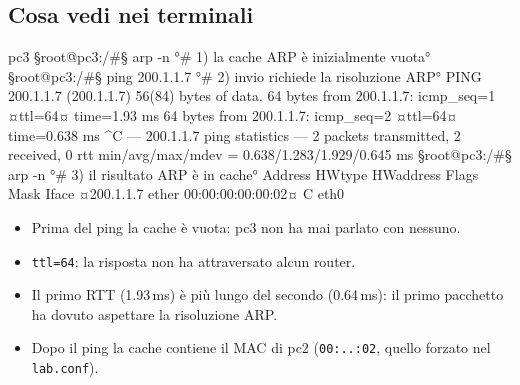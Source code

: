 \subsection{Cosa vedi nei terminali}
\begin{terminale}{pc3}
§root@pc3:/#§ arp -n                          °# 1) la cache ARP è inizialmente vuota°
§root@pc3:/#§ ping 200.1.1.7                  °# 2) invio richiede la risoluzione ARP°
PING 200.1.1.7 (200.1.1.7) 56(84) bytes of data.
64 bytes from 200.1.1.7: icmp_seq=1 ¤ttl=64¤ time=1.93 ms
64 bytes from 200.1.1.7: icmp_seq=2 ¤ttl=64¤ time=0.638 ms
^C
--- 200.1.1.7 ping statistics ---
2 packets transmitted, 2 received, 0%
rtt min/avg/max/mdev = 0.638/1.283/1.929/0.645 ms
§root@pc3:/#§ arp -n                          °# 3) il risultato ARP è in cache°
Address        HWtype  HWaddress            Flags Mask  Iface
¤200.1.1.7      ether   00:00:00:00:00:02¤    C           eth0
\end{terminale}
\begin{esempio}
\begin{itemize}
  \item Prima del ping la cache è vuota: pc3 non ha mai parlato con nessuno.
  \item \texttt{ttl=64}: la risposta non ha attraversato alcun router.
  \item Il primo RTT (1.93\,ms) è più lungo del secondo (0.64\,ms): il primo pacchetto ha dovuto aspettare la risoluzione ARP.
  \item Dopo il ping la cache contiene il MAC di pc2 (\texttt{00:..:02}, quello forzato nel \texttt{lab.conf}).
\end{itemize}
\end{esempio}

